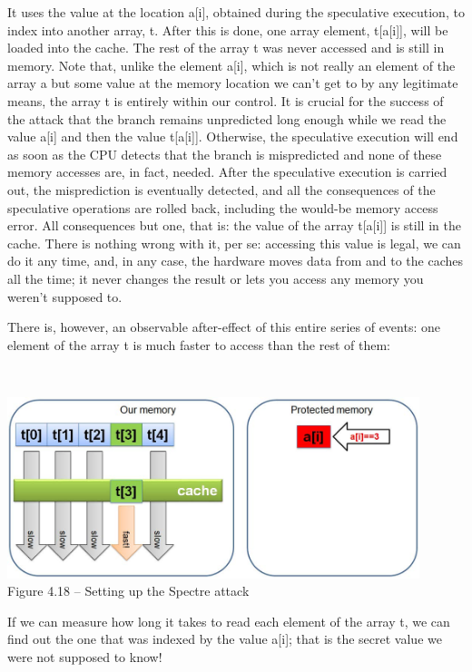 It uses the value at the location a[i], obtained during the speculative execution, to index into another array, t. After this is done, one array element, t[a[i]], will be loaded into the cache. The rest of the array t was never accessed and is still in memory. Note that, unlike the element a[i], which is not really an element of the array a but some value at the memory location we can't get to by any legitimate means, the array t is entirely within our control. It is crucial for the success of the attack that the branch remains unpredicted long enough while we read the value a[i] and then the value t[a[i]]. Otherwise, the speculative execution will end as soon as the CPU detects that the branch is mispredicted and none of these memory accesses are, in fact, needed. After the speculative execution is carried out, the misprediction is eventually detected, and all the consequences of the speculative operations are rolled back, including the would-be memory access error. All consequences but one, that is: the value of the array t[a[i]] is still in the cache. There is nothing wrong with it, per se: accessing this value is legal, we can do it any time, and, in any case, the hardware moves data from and to the caches all the time; it never changes the result or lets you access any memory you weren't supposed to.

There is, however, an observable after-effect of this entire series of events: one element of the array t is much faster to access than the rest of them:

\hspace*{\fill} \\ %
\begin{center}
\includegraphics[width=0.9\textwidth]{content/1/chapter4/images/18.jpg}\\
Figure 4.18 – Setting up the Spectre attack
\end{center}

If we can measure how long it takes to read each element of the array t, we can find out the one that was indexed by the value a[i]; that is the secret value we were not supposed to know!

